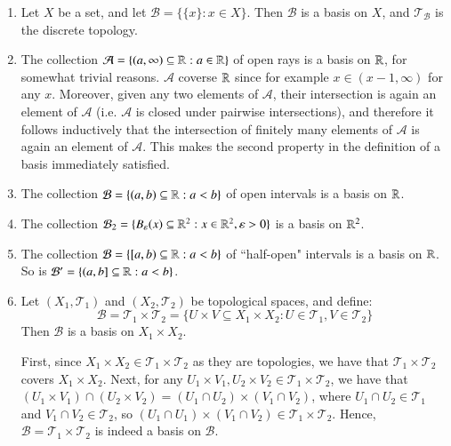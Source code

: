 \documentclass[12pt, a4paper, twoside, openright, titlepage]{book}
\begin{document}
\begin{eg}{}{}
    \leavevmode
    \begin{enumerate}
        \item Let $X$ be a set, and let $\mathcal{B} = \{\{x\}:x \in X\}$. Then $\mathcal{B}$ is a basis on $X$, and $\mathcal{T}_{\mathcal{B}}$ is the discrete topology.
        \item The collection $\mathcal{A} = \{(a,\infty)\subseteq \mathbb R:a \in \mathbb R\}$ of open rays is a basis on $\mathbb R$, for somewhat trivial reasons. $\mathcal{A}$ coverse $\mathbb R$ since for example $x \in (x-1,\infty)$ for any $x$. Moreover, given any two elements of $\mathcal{A}$, their intersection is again an element of $\mathcal{A}$ (i.e. $\mathcal{A}$ is closed under pairwise intersections), and therefore it follows inductively that the intersection of finitely many elements of $\mathcal{A}$ is again an element of $\mathcal{A}$. This makes the second property in the definition of a basis immediately satisfied. 
        \item The collection $\mathcal{B} = \{(a,b) \subseteq \mathbb R:a <b\}$ of open intervals is a basis on $\mathbb R$.
        \item The collection $\mathcal{B}_2 = \{B_{\varepsilon}(x) \subseteq \mathbb R^2:x \in \mathbb R^2,\varepsilon > 0\}$ is a basis on $\mathbb R^2$.
        \item The collection $\mathcal{B} = \{[a,b)\subseteq \mathbb R:a < b\}$ of ``half-open" intervals is a basis on $\mathbb R$. So is $\mathcal{B}' = \{(a,b]\subseteq \mathbb R:a<b\}$.
        \item Let $(X_1,\mathcal{T}_1)$ and $(X_2,\mathcal{T}_2)$ be topological spaces, and define: \begin{equation*}
                \mathcal{B} = \mathcal{T}_1\times \mathcal{T}_2 = \{U\times V\subseteq X_1\times X_2: U\in \mathcal{T}_1,V\in\mathcal{T}_2\}
        \end{equation*}
            Then $\mathcal{B}$ is a basis on $X_1\times X_2$.
            \begin{proof*}{}{}
                First, since $X_1\times X_2 \in \mathcal{T}_1\times \mathcal{T}_2$ as they are topologies, we have that $\mathcal{T}_1\times \mathcal{T}_2$ covers $X_1\times X_2$. Next, for any $U_1\times V_1, U_2\times V_2 \in \mathcal{T}_1\times \mathcal{T}_2$, we have that $(U_1\times V_1)\cap(U_2\times V_2) = (U_1\cap U_2)\times (V_1\cap V_2)$, where $U_1\cap U_2 \in \mathcal{T}_1$ and $V_1\cap V_2 \in \mathcal{T}_2$, so $(U_1\cap U_1)\times (V_1\cap V_2) \in \mathcal{T}_1\times \mathcal{T}_2$. Hence, $\mathcal{B} = \mathcal{T}_1\times \mathcal{T}_2$ is indeed a basis on $\mathcal{B}$.

\end{proof*}
\end{enumerate}
\end{eg}
\end{document}
